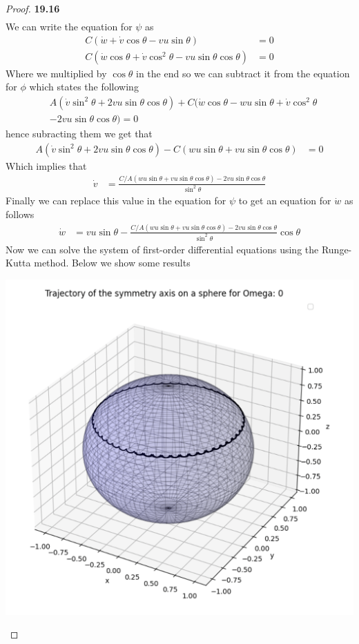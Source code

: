 \documentclass[11pt]{article}
\theoremstyle{definition}
\begin{document}
\begin{proof}{\textbf{19.16}}
\begin{align*}
    \end{align*}
    We can write the equation for $\psi$ as
    \begin{align*}
        C(\dot{w} + \dot{v}\cos\theta - vu\sin\theta) &= 0\\
        C(\dot{w}\cos\theta + \dot{v}\cos^2\theta - vu\sin\theta\cos\theta) &= 0
    \end{align*}
    Where we multiplied by $\cos\theta$ in the end so we can subtract it from
    the equation for $\phi$ which states the following
    \begin{align*}
        &A(\dot v\sin^2\theta + 2vu\sin\theta\cos\theta)
        + C(\dot{w}\cos\theta - wu\sin\theta
        + \dot{v}\cos^2\theta\\
        &- 2vu\sin\theta\cos\theta) = 0
    \end{align*}
    hence subracting them we get that
    \begin{align*}
        A(\dot v\sin^2\theta + 2vu\sin\theta\cos\theta)
        - C(wu\sin\theta + vu\sin\theta\cos\theta) &= 0
    \end{align*}
    Which implies that
    \begin{align*}
        \dot v &= \frac{
            C/A(wu\sin\theta + vu\sin\theta\cos\theta)
        - 2vu\sin\theta\cos\theta}{\sin^2\theta}
    \end{align*}
    Finally we can replace this value in the equation for $\psi$ to get
    an equation for $\dot{w}$ as follows
    \begin{align*}
        \dot{w} &= vu\sin\theta - \frac{
            C/A(wu\sin\theta + vu\sin\theta\cos\theta)
        - 2vu\sin\theta\cos\theta}{\sin^2\theta}\cos\theta
    \end{align*}
    Now we can solve the system of first-order differential equations
    using the Runge-Kutta method.
    Below we show some results
    \begin{center}
        \includegraphics[scale=0.4]{ch19-16-1.png}

\end{center}
\end{proof}
\end{document}
